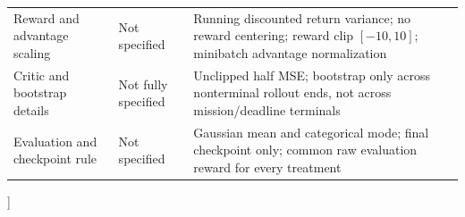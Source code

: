 {\begin{tabular}{@{}p{}p{}p{}@{}}
Reward and advantage scaling & Not specified & Running discounted return variance; no reward centering;
reward clip $[-10,10]$; minibatch advantage normalization \\
Critic and bootstrap details & Not fully specified & Unclipped half MSE; bootstrap only across nonterminal
rollout ends, not across mission/deadline terminals \\
Evaluation and checkpoint rule & Not specified & Gaussian mean and categorical mode; final checkpoint only;
common raw evaluation reward for every treatment \\
\bottomrule
\end{tabular}
\vspace{1.5em}
}]

